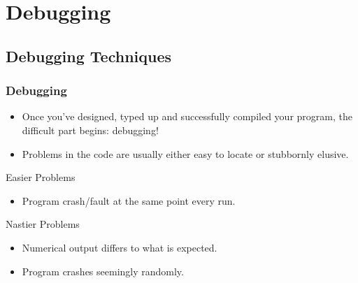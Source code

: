 \documentclass[smaller,table]{beamer}
\begin{document}
\section{Debugging}
\subsection{Debugging Techniques}
\begin{frame}
\frametitle{Debugging}
\begin{itemize}
\item Once you've designed, typed up and successfully compiled your program, the difficult part begins: debugging!
\item Problems in the code are usually either easy to locate or stubbornly elusive.
\end{itemize}

\begin{exampleblock}{Easier Problems}
\begin{itemize}
\item Program crash/fault at the same point every run.
\end{itemize}
\end{exampleblock}

\begin{alertblock}{Nastier Problems}
\begin{itemize}
\item Numerical output differs to what is expected.
\item Program crashes seemingly randomly.
\end{itemize}
\end{alertblock}
\end{frame}
\end{document}
